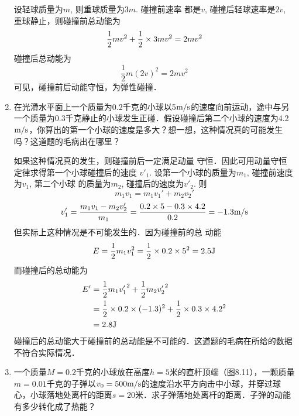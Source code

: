 \begin{enumerate}
\begin{solution}
    设轻球质量为$m$, 则重球质量为$3m$. 碰撞前速率
    都是$v$, 碰撞后轻球速率是$2v$, 重球静止，则碰撞前总动能为
   \[\frac{1}{2}mv^2+\frac{1}{2}\times 3mv^2=2mv^2\]
    碰撞后总动能为
\[\frac{1}{2}m(2v)^2=2mv^2\]
    可见，碰撞前后动能守恒，为弹性碰撞．
\end{solution}
   \item 在光滑水平面上一个质量为0.2千克的小球以5$\text{m}/\text{s}$的速度向前运动，途中与另一个质量为0.3千克静止的小球发生正碰．假设碰撞后第二个小球的速度为4.2$\text{m}/\text{s}$，你算出的第一个小球的速度是多大？想一想，这种情况真的可能发生吗？这道题的毛病出在哪里？

   \begin{solution}
    如果这种情况真的发生，则碰撞前后一定满足动量
    守恒．因此可用动量守恒定律求得第一个小球碰撞后的速度
    $v'_1$. 设第一个小球的质量为$m_1$, 碰撞前速度为$v_1$, 第二个小球
    的质量为$m_2$, 碰撞后的速度为$v'_2$. 则
\[m_1v_1=m_1v_1'+m_2v_2'\]
\[v'_1=\frac{m_1v_1-m_2v_2'}{m_1}=\frac{0.2\times 5-0.3\times 4.2}{0.2}=-1.3\text{m}/\text{s}\]
但实际上这种情况是不可能发生的．因为碰撞前的总
动能
\[E=\frac{1}{2}m_1v_1^2=\frac{1}{2}\times 0.2\times 5^2=2.5{\rm J}\]
而碰撞后的总动能为
\[\begin{split}
    E'&=\frac{1}{2}m_1{v'_1}^2+\frac{1}{2}m_2{v'_2}^2\\
    &=\frac{1}{2}\times 0.2\times (-1.3)^2+\frac{1}{2}\times 0.3\times 4.2^2\\
    &=2.8{\rm J}
\end{split}\]
碰撞后的总动能大于碰撞前的总动能是不可能的．这道题的毛病在所给的数据不符合实际情况．
   \end{solution}
   \item 一个质量$M=0.2$千克的小球放在高度$h=5$米的直杆顶端（图8.11），一颗质量$m=0.01$千克的子弹以$v_0=500\text{m}/\text{s}$的速度沿水平方向击中小球，并穿过球心，小球落地处离杆的距离$s=20$米．求子弹落地处离杆的距离．子弹的动能有多少转化成了热能？
   \begin{figure}[htp]\centering
\end{figure}
\end{enumerate}
